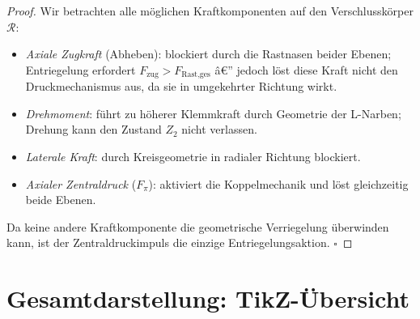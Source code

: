 ﻿\documentclass[12pt, a4paper]{article}
\theoremstyle{remark}
\newcommand{\Ring}{\mathcal{R}}
\begin{document}
\begin{proof}
  Wir betrachten alle möglichen Kraftkomponenten auf den Verschlusskörper $\Ring$:
  \begin{itemize}
    \item \textit{Axiale Zugkraft} (Abheben): blockiert durch die Rastnasen beider Ebenen;
          Entriegelung erfordert $F_{\text{zug}} > F_{\text{Rast,ges}}$ â€” jedoch löst diese
          Kraft nicht den Druckmechanismus aus, da sie in umgekehrter Richtung wirkt.
    \item \textit{Drehmoment}: führt zu höherer Klemmkraft durch Geometrie der L-Narben;
          Drehung kann den Zustand $Z_2$ nicht verlassen.
    \item \textit{Laterale Kraft}: durch Kreisgeometrie in radialer Richtung blockiert.
    \item \textit{Axialer Zentraldruck} ($F_\pi$): aktiviert die Koppelmechanik und löst
          gleichzeitig beide Ebenen.
  \end{itemize}
  Da keine andere Kraftkomponente die geometrische Verriegelung überwinden kann, ist
  der Zentraldruckimpuls die einzige Entriegelungsaktion. $\square$
\end{proof}

\section{Gesamtdarstellung: TikZ-Übersicht}
\end{document}
